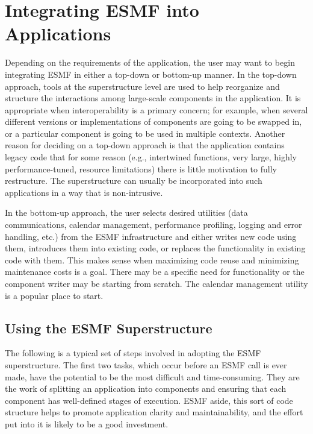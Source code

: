 \section{Integrating ESMF into Applications}

Depending on the requirements of the application, the user may 
want to begin integrating ESMF in either a top-down or bottom-up 
manner.  In the top-down approach, tools at the superstructure 
level are used to help reorganize and structure the interactions
among large-scale components in the application.  It is appropriate
when interoperability is a primary concern; for example, when 
several different versions or implementations of components are going 
to be swapped in, or a particular component is going to be used 
in multiple contexts.  Another reason for deciding on a top-down 
approach is that the application contains legacy code that for 
some reason (e.g., intertwined functions, very large,
highly performance-tuned, resource limitations) there is little 
motivation to fully restructure.  The superstructure can usually be 
incorporated into such applications in a way that is non-intrusive.

In the bottom-up approach, the user selects desired utilities 
(data communications, calendar management, performance profiling,
logging and error handling, etc.) from the ESMF infrastructure 
and either writes new code using them, introduces them into 
existing code, or replaces the functionality in existing code 
with them.  This makes sense when maximizing code reuse and 
minimizing maintenance costs is a goal.  There may be a specific
need for functionality or the component writer may be starting
from scratch.  The calendar management utility is a popular
place to start.

\subsection{Using the ESMF Superstructure}

The following is a typical set of steps involved in adopting
the ESMF superstructure.  The first two tasks, which occur 
before an ESMF call is ever made, have the potential to be 
the most difficult and time-consuming.  They are the work 
of splitting an application into components and ensuring that
each component has well-defined stages of execution.  ESMF
aside, this sort of code structure helps to promote application
clarity and maintainability, and the effort put into it is likely
to be a good investment.

